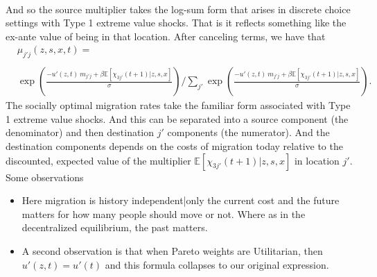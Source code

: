 \documentclass[12pt,pdftex]{article}
\begin{document}
\begin{onehalfspacing}
{\begin{align}
\end{align}}And so the source multiplier takes the log-sum form that arises in discrete choice settings with Type 1 extreme value shocks. That is it reflects something like the ex-ante value of being in that location. After canceling terms, we have that
{\small
\begin{align}
& \mu_{j'j}(z,s,x,t) =   \\
\nonumber \\
&\exp \left(\frac{- u'(z, t)  \ m_{j'j} + \beta\mathbb{E}\left[\chi_{3j'}(t+1)| z, s,x \right]}{\sigma } \right)  \Bigg / \sum_{j'} \exp \left( \frac{-u'(z, t) \ m_{j'j} + \beta\mathbb{E}\left[\chi_{3j'}(t+1)| z,s,x \right]}{\sigma } \right). \nonumber
\end{align}}The socially optimal migration rates take the familiar form associated with Type 1 extreme value shocks. And this can be separated into a source component (the denominator) and then destination $j'$ components (the numerator). And the destination components depends on the costs of migration today relative to the discounted, expected value of the multiplier $\mathbb{E}\left[\chi_{3j'}(t+1)|z, s,x \right]$ in location $j'$. Some observations
\begin{itemize}
\item Here migration is history independent|only the current cost and the future matters for how many people should move or not. Where as in the decentralized equilibrium, the past matters.

\item A second observation is that when Pareto weights are Utilitarian, then $u'(z, t) = u'(t)$ and this formula collapses to our original expression.


\end{itemize}
\end{onehalfspacing}
\end{document}
